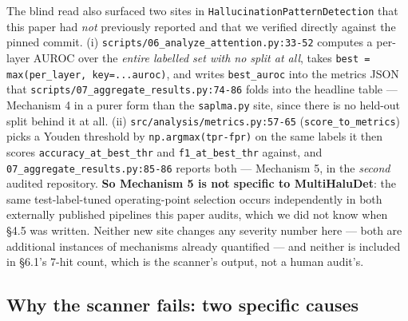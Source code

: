 \documentclass[10pt]{article} %
\begin{document}
The blind read also surfaced two sites in
\texttt{HallucinationPatternDetection} that this paper had \emph{not}
previously reported and that we verified directly against the pinned commit.
(i) \texttt{scripts/06\_analyze\_attention.py:33-52} computes a per-layer AUROC
over the \emph{entire labelled set with no split at all}, takes
\texttt{best = max(per\_layer, key=...auroc)}, and writes \texttt{best\_auroc}
into the metrics JSON that \texttt{scripts/07\_aggregate\_results.py:74-86}
folds into the headline table --- Mechanism 4 in a purer form than the
\texttt{saplma.py} site, since there is no held-out split behind it at all.
(ii) \texttt{src/analysis/metrics.py:57-65} (\texttt{score\_to\_metrics}) picks
a Youden threshold by \texttt{np.argmax(tpr-fpr)} on the same labels it then
scores \texttt{accuracy\_at\_best\_thr} and \texttt{f1\_at\_best\_thr} against,
and \texttt{07\_aggregate\_results.py:85-86} reports both --- Mechanism 5, in
the \emph{second} audited repository. \textbf{So Mechanism 5 is not specific to
MultiHaluDet}: the same test-label-tuned operating-point selection occurs
independently in both externally published pipelines this paper audits, which
we did not know when §4.5 was written. Neither new site changes any severity
number here --- both are additional instances of mechanisms already quantified
--- and neither is included in §6.1's 7-hit count, which is the scanner's output, not a human audit's.

\subsection{Why the scanner fails: two specific causes}
\end{document}
